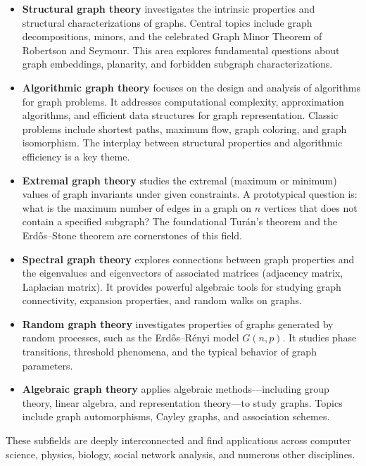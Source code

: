 \documentclass[11pt, a4paper]{ctexrep}
\begin{document}
\begin{itemize}
    \item \textbf{Structural graph theory} investigates the intrinsic properties and structural characterizations of graphs. Central topics include graph decompositions, minors, and the celebrated Graph Minor Theorem of Robertson and Seymour. This area explores fundamental questions about graph embeddings, planarity, and forbidden subgraph characterizations.

    \item \textbf{Algorithmic graph theory} focuses on the design and analysis of algorithms for graph problems. It addresses computational complexity, approximation algorithms, and efficient data structures for graph representation. Classic problems include shortest paths, maximum flow, graph coloring, and graph isomorphism. The interplay between structural properties and algorithmic efficiency is a key theme.

    \item \textbf{Extremal graph theory} studies the extremal (maximum or minimum) values of graph invariants under given constraints. A prototypical question is: what is the maximum number of edges in a graph on $n$ vertices that does not contain a specified subgraph? The foundational Turán's theorem and the Erdős--Stone theorem are cornerstones of this field.

    \item \textbf{Spectral graph theory} explores connections between graph properties and the eigenvalues and eigenvectors of associated matrices (adjacency matrix, Laplacian matrix). It provides powerful algebraic tools for studying graph connectivity, expansion properties, and random walks on graphs.

    \item \textbf{Random graph theory} investigates properties of graphs generated by random processes, such as the Erdős--Rényi model $G(n,p)$. It studies phase transitions, threshold phenomena, and the typical behavior of graph parameters.

    \item \textbf{Algebraic graph theory} applies algebraic methods---including group theory, linear algebra, and representation theory---to study graphs. Topics include graph automorphisms, Cayley graphs, and association schemes.
\end{itemize}

These subfields are deeply interconnected and find applications across computer science, physics, biology, social network analysis, and numerous other disciplines.
\end{document}
